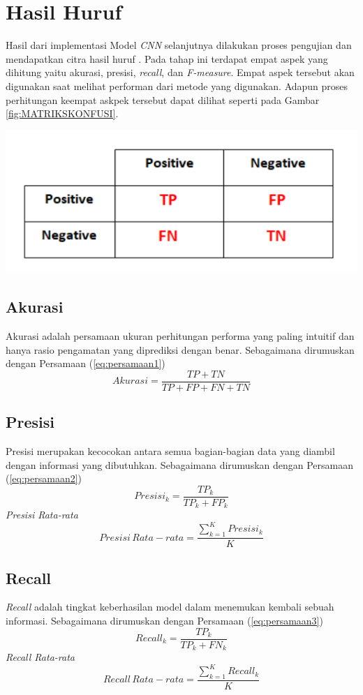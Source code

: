\section{Hasil Huruf}
Hasil dari implementasi Model \textit{CNN} selanjutnya dilakukan proses pengujian dan mendapatkan citra hasil huruf . Pada tahap ini terdapat empat aspek yang dihitung yaitu akurasi, presisi, \textit{recall}, dan \emph {F-measure}. Empat aspek tersebut akan digunakan saat melihat performan dari metode yang digunakan. Adapun proses perhitungan keempat askpek tersebut dapat dilihat seperti pada Gambar \ref{fig:MATRIKSKONFUSI}.
\begin{center}
	\includegraphics[width=0.7\linewidth]{gambar/bener/Nilai-Konfusi-Matriks.png}
	\label{fig:MATRIKSKONFUSI}
\end{center}

\subsection{Akurasi}
Akurasi adalah persamaan ukuran perhitungan performa yang paling intuitif dan hanya rasio pengamatan yang diprediksi dengan benar. Sebagaimana dirumuskan dengan Persamaan (\ref{eq:persamaan1})
\begin{equation}\label{eq:persamaan1}
Akurasi=\frac{TP+TN}{TP+FP+FN+TN}
\end{equation}
\subsection{Presisi}
Presisi merupakan kecocokan antara semua bagian-bagian data yang diambil dengan informasi yang dibutuhkan. Sebagaimana dirumuskan dengan Persamaan (\ref{eq:persamaan2})
\begin{equation}\label{eq:persamaan2}
Presisi_k=\frac{TP_k}{TP_k+FP_k}
\end{equation} 
{\it Presisi Rata-rata}
\begin{equation}\label{eq:persamaan3}
Presisi \, Rata-rata=\frac{\sum_{k=1}^K Presisi_k}{K}
\end{equation} 
\subsection{Recall}
\textit{Recall} adalah tingkat keberhasilan model dalam menemukan
kembali sebuah informasi. Sebagaimana dirumuskan dengan Persamaan (\ref{eq:persamaan3})
\begin{equation}\label{eq:persamaan4}
Recall_k=\frac{TP_k}{TP_k+FN_k}
\end{equation} 
{\it Recall Rata-rata}
\begin{equation}\label{eq:persamaan5}
Recall \, Rata-rata=\frac{\sum_{k=1}^K Recall_k}{K}
\end{equation} 
